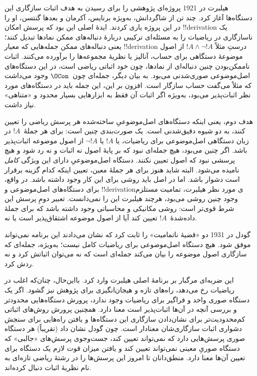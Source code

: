 \documentclass[../../../include/open-logic-section]{subfiles}
\begin{document}
هیلبرت در 1921 پروژه‌ای پژوهشی را برای رسیدن به هدف اثبات سازگاری
این دستگاه‌ها آغاز کرد. چند تن از شاگردانش، به‌ویژه برنایس، آکرمان و
بعدها گنتسن، او را در این پروژه یاری کردند. ایدهٔ اصلی این بود که
پرسش امکان !!{derivation} یک ناسازگاری در ریاضیات را به مسئله‌ای ترکیبی
دربارهٔ دنباله‌های ممکن نمادها تبدیل کنند؛ یعنی دنباله‌های ممکن
جمله‌هایی که معیار !!{derivation} درستِ مثلاً $!A\land\lnot !A$ از اصول
موضوعهٔ دستگاهی برای حساب، آنالیز یا نظریهٔ مجموعه‌ها را برآورده
می‌کنند. اثبات ناممکن‌بودن چنین دنباله‌ای از نمادها، چون خود اثباتی
ریاضی است، در این دستگاه‌های اصل‌موضوعی صوری‌شدنی می‌بود. به بیان
دیگر، جمله‌ای چون~$\OCon$ وجود می‌داشت که مثلاً می‌گفت حساب سازگار
است. افزون بر این، این جمله باید در دستگاه‌های مورد نظر اثبات‌پذیر
می‌بود، به‌ویژه اگر اثبات آن فقط به ابزارهایی بسیار محدود و «متناهی»
نیاز داشت.

هدف دوم، یعنی اینکه دستگاه‌های اصل‌موضوعیِ ساخته‌شده هر پرسش ریاضی را
تعیین کنند، به دو شیوه دقیق‌شدنی است. یک صورت‌بندی چنین است: برای هر
جملهٔ~$!A$ در زبان دستگاهی اصل‌موضوعی برای ریاضیات، یا $!A$ یا
$\lnot !A$ از اصول موضوعه اثبات‌پذیر باشد. اگر چنین می‌بود، هیچ جمله‌ای
نبود که بر پایهٔ اصول نه اثبات و نه رد شود و هیچ پرسشی نبود که اصول
تعیین نکنند. دستگاه اصل‌موضوعیِ دارای این ویژگی \emph{کامل} نامیده
می‌شود. البته شاید هنوز برای هر جملهٔ معین، تعیین اینکه کدام گزینه
برقرار است دشوار باشد. اما در اصل باید روشی برای این کار وجود داشته
باشد. در واقع، برای دستگاه‌های اصل‌موضوعی و !!{derivation}ی مورد نظر
هیلبرت، تمامیت مستلزم وجود چنین روشی می‌بود، هرچند هیلبرت این را
نمی‌دانست. تعبیر دومِ پرسش این شرط قوی‌تر است: روشی مکانیکی و محاسباتی
وجود داشته باشد که برای جملهٔ داده‌شدهٔ~$!A$ تعیین کند آیا از اصول
موضوعه اشتقاق‌پذیر است یا نه.

گودل در 1931 دو «قضیهٔ ناتمامیت» را ثابت کرد که نشان می‌دادند این
برنامه نمی‌تواند موفق شود. هیچ دستگاه اصل‌موضوعی برای ریاضیات کامل
نیست؛ به‌ویژه، جمله‌ای که سازگاری اصول موضوعه را بیان می‌کند جمله‌ای
است که نه می‌توان اثباتش کرد و نه ردش کرد.

این ضربه‌ای مرگبار بر برنامهٔ اصلی هیلبرت وارد کرد. بااین‌حال، چنان‌که
اغلب در ریاضیات رخ می‌دهد، راه‌های تازه و هیجان‌انگیزی برای پژوهش نیز
گشود. اگر یک دستگاه صوری واحد و فراگیر برای ریاضیات وجود ندارد،
پرورش دستگاه‌هایی محدودتر و بررسی آنچه در آن‌ها اثبات‌پذیر است معنا
دارد. همچنین پرورش روش‌های اثباتی کم‌محدودیت‌تر برای نشان‌دادن سازگاری
این دستگاه‌ها و یافتن راه‌هایی برای سنجش دشواری اثبات سازگاری‌شان
معنادار است. چون گودل نشان داد (تقریباً) هر دستگاه صوری پرسش‌هایی دارد
که نمی‌تواند تعیین کند، جست‌وجوی پرسش‌های «جالبی» که دستگاه صوریِ
معینی نمی‌تواند تعیین کند و یافتن میزان قوت لازم یک دستگاه برای
تعیین آن‌ها معنا دارد. منطق‌دانان تا امروز این پرسش‌ها را در رشتهٔ
ریاضی تازه‌ای به نام نظریهٔ اثبات دنبال کرده‌اند.
\end{document}
